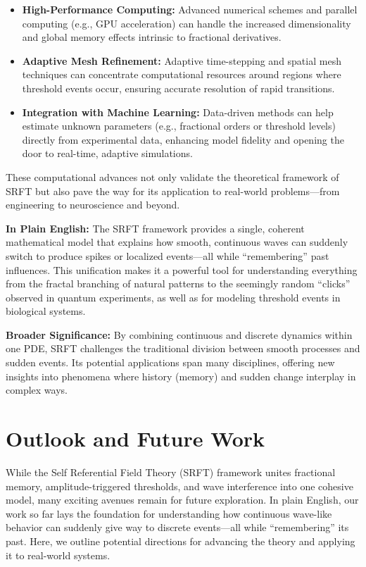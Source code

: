 \documentclass[12pt]{article}
\begin{document}
\begin{itemize}
    \item \textbf{High-Performance Computing:}  
          Advanced numerical schemes and parallel computing (e.g., GPU acceleration) can handle the increased dimensionality and global memory effects intrinsic to fractional derivatives.
    \item \textbf{Adaptive Mesh Refinement:}  
          Adaptive time-stepping and spatial mesh techniques can concentrate computational resources around regions where threshold events occur, ensuring accurate resolution of rapid transitions.
    \item \textbf{Integration with Machine Learning:}  
          Data-driven methods can help estimate unknown parameters (e.g., fractional orders or threshold levels) directly from experimental data, enhancing model fidelity and opening the door to real-time, adaptive simulations.
\end{itemize}

\noindent
These computational advances not only validate the theoretical framework of SRFT but also pave the way for its application to real-world problems—from engineering to neuroscience and beyond.

\medskip

\noindent
\textbf{In Plain English:}  
The SRFT framework provides a single, coherent mathematical model that explains how smooth, continuous waves can suddenly switch to produce spikes or localized events—all while “remembering” past influences. This unification makes it a powerful tool for understanding everything from the fractal branching of natural patterns to the seemingly random “clicks” observed in quantum experiments, as well as for modeling threshold events in biological systems.

\medskip

\noindent
\textbf{Broader Significance:}  
By combining continuous and discrete dynamics within one PDE, SRFT challenges the traditional division between smooth processes and sudden events. Its potential applications span many disciplines, offering new insights into phenomena where history (memory) and sudden change interplay in complex ways.

\section{Outlook and Future Work}
\label{sec:outlook_future}

While the Self Referential Field Theory (SRFT) framework unites fractional memory, amplitude-triggered thresholds, and wave interference into one cohesive model, many exciting avenues remain for future exploration. In plain English, our work so far lays the foundation for understanding how continuous wave-like behavior can suddenly give way to discrete events—all while “remembering” its past. Here, we outline potential directions for advancing the theory and applying it to real-world systems.
\end{document}

